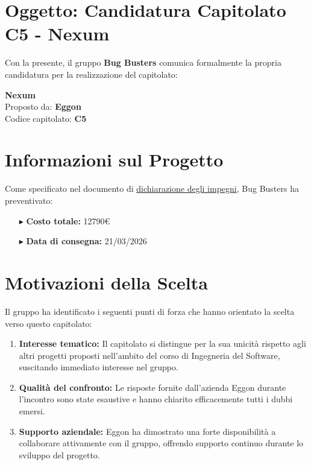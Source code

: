 \documentclass[a4paper,11pt]{article}
\begin{document}
\vspace{2em}

\section*{Oggetto: Candidatura Capitolato C5 - Nexum}

Con la presente, il gruppo \textbf{Bug Busters} comunica formalmente la propria candidatura per la realizzazione del capitolato:

\begin{center}
    {\Large\textbf{Nexum}}\\[0.3cm]
    Proposto da: \textbf{Eggon}\\
    Codice capitolato: \textbf{C5}
\end{center}

\vspace{1.5em}

\section*{Informazioni sul Progetto}

Come specificato nel documento di \href{https://bugbustersunipd.github.io/BugBusterSite/assets/docs/DICHIARAZIONE_IMPEGNI/Dichiarazione_impegni.pdf}{dichiarazione degli impegni}, Bug Busters ha preventivato:

\begin{itemize}[leftmargin=2cm, itemsep=0.5em]
    \item[\textcolor{primarycolor}{$\blacktriangleright$}] \textbf{Costo totale:} 12790€
    \item[\textcolor{primarycolor}{$\blacktriangleright$}] \textbf{Data di consegna:} 21/03/2026
\end{itemize}

\vspace{1.5em}

\section*{Motivazioni della Scelta}

Il gruppo ha identificato i seguenti punti di forza che hanno orientato la scelta verso questo capitolato:

\begin{enumerate}[leftmargin=2cm, itemsep=0.8em]
    \item \textbf{Interesse tematico:} Il capitolato si distingue per la sua unicità rispetto agli altri progetti proposti nell'ambito del corso di Ingegneria del Software, 
    suscitando immediato interesse nel gruppo.
    
    \item \textbf{Qualità del confronto:} Le risposte fornite dall'azienda Eggon durante l'incontro sono state esaustive e hanno chiarito efficacemente tutti i dubbi emersi.
    
    \item \textbf{Supporto aziendale:} Eggon ha dimostrato una forte disponibilità a collaborare attivamente con il gruppo, offrendo supporto continuo durante lo sviluppo del progetto.
\end{enumerate}
\end{document}
